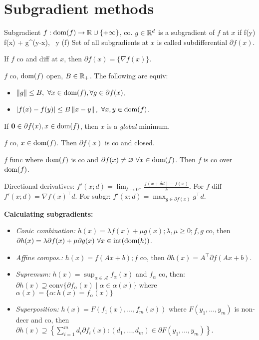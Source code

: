 \section*{Subgradient methods}

\begin{mathbox}
    {Subgradient}
    {$f: \operatorname*{\text{dom}}(f) \to \mathbb{R} \cup \{+\infty\}$, co. $g \in \mathbb{R}^d$ is a subgradient of $f$ at $x$ if}
    {f(y) \geq f(x) + g^\top (y-x), \ \forall y \in \dom(f)}
    {Set of all subgradients at $x$ is called subdifferential $\partial f(x)$.}
\end{mathbox}

If $f$ co and diff at $x$, then $\partial f(x) = \{\nabla f(x)\}$.

$f$ co, $\operatorname*{\text{dom}}(f)$ open, $B \in \mathbb{R}_+$. The following are equiv:
\begin{itemize}
    \item $\left\lVert g \right\rVert \leq B, \ \forall x \in \operatorname*{\text{dom}}(f), \forall g \in \partial f(x)$.
    \item $\left\lvert f(x) - f(y) \right\rvert \leq B \left\lVert x - y \right\rVert, \ \forall x, y \in \operatorname*{\text{dom}}(f)$.
\end{itemize}

If $\mathbf{0} \in \partial f(x), x \in \operatorname*{\text{dom}}(f)$, then $x$ is a \textit{global} minimum.

$f$ co, $x \in \operatorname*{\text{dom}}(f)$. Then $\partial f(x)$ is co and closed. 

$f$ func where $\operatorname*{\text{dom}}(f)$ is co and $\partial f(x) \neq \varnothing \ \forall x \in \operatorname*{\text{dom}}(f)$. Then $f$ is co over $\operatorname*{\text{dom}}(f)$. 

Directional derivatives: $f'(x;d) = \lim_{\delta \to 0^+} \frac{f(x + \delta d) - f(x)}{\delta}$. For $f$ diff $f'(x;d) = \nabla f(x)^\top d$. For subgr: $f'(x;d) = \max_{g \in \partial f(x)} g^\top d$.

\textbf{Calculating subgradients:} 
\begin{itemize}
    \item \textit{Conic combination:} $h(x) = \lambda f(x) + \mu g(x); \lambda, \mu \geq 0; f, g$ co, then $\partial h(x) = \lambda \partial f(x) + \mu \partial g(x)\ \forall x \in \text{int}(\operatorname*{\text{dom}}(h))$.
    \item \textit{Affine compos.:} $h(x) = f(Ax + b); f$ co, then $\partial h(x) = A^\top \partial f(Ax + b)$.
    \item \textit{Supremum:} $h(x) = \sup_{\alpha \in \mathcal{A}} f_\alpha (x)$ and $f_\alpha$ co, then: $\partial h(x) \supseteq \text{conv}\{\partial f_\alpha (x) \mid \alpha \in \alpha(x)\}$ where $\alpha(x) = \{\alpha : h(x) = f_\alpha (x)\}$
    \item \textit{Superposition:} $h(x) = F(f_1(x),\dots,f_m(x))$ where $F(y_1, \dots, y_m)$ is non-decr and co, then $\partial h(x) \supseteq \left\{ \sum_{i=1}^{m} d_i \partial f_i(x) : (d_1, \dots, d_m) \in \partial F(y_1, \dots, y_m) \right\}$.
\end{itemize}


